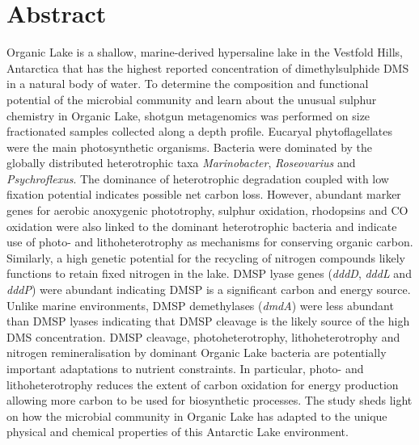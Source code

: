 \section{Abstract}
Organic Lake is a shallow, marine-derived hypersaline lake in the Vestfold Hills, Antarctica that has the highest reported concentration of dimethylsulphide \ac{DMS} in a natural body of water.
To determine the composition and functional potential of the microbial community and learn about the unusual sulphur chemistry in Organic Lake, shotgun metagenomics was performed on size fractionated samples collected along a depth profile.
Eucaryal phytoflagellates were the main photosynthetic organisms.
Bacteria were dominated by the globally distributed heterotrophic taxa \emph{Marinobacter}, \emph{Roseovarius} and \emph{Psychroflexus}.
The dominance of heterotrophic degradation coupled with low fixation potential indicates possible net carbon loss.
However, abundant marker genes for aerobic anoxygenic phototrophy, sulphur oxidation, rhodopsins and CO oxidation were also linked to the dominant heterotrophic bacteria and indicate use of photo- and lithoheterotrophy as mechanisms for conserving organic carbon.
Similarly, a high genetic potential for the recycling of nitrogen compounds likely functions to retain fixed nitrogen in the lake.
\ac{DMSP} lyase genes (\emph{dddD}, \emph{dddL} and \emph{dddP}) were abundant indicating \ac{DMSP} is a significant carbon and energy source.
Unlike marine environments, \ac{DMSP} demethylases (\emph{dmdA}) were less abundant than \ac{DMSP} lyases indicating that \ac{DMSP} cleavage is the likely source of the high \ac{DMS} concentration.
\ac{DMSP} cleavage, photoheterotrophy, lithoheterotrophy and nitrogen remineralisation by dominant Organic Lake bacteria are potentially important adaptations to nutrient constraints.
In particular, photo- and lithoheterotrophy reduces the extent of carbon oxidation for energy production allowing more carbon to be used for biosynthetic processes.
The study sheds light on how the microbial community in Organic Lake has adapted to the unique physical and chemical properties of this Antarctic Lake environment.

\newpage

\acresetall
